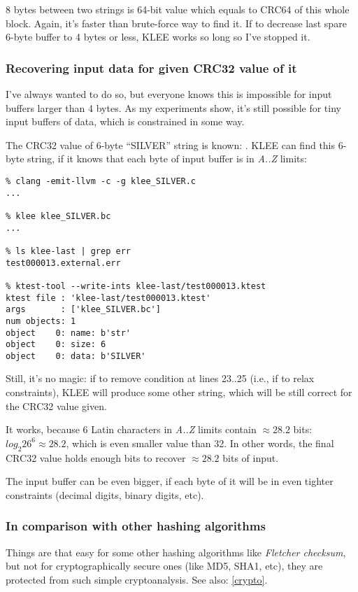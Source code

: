 8 bytes between two strings is 64-bit value which equals to CRC64 of this whole block.
Again, it's faster than brute-force way to find it.
If to decrease last spare 6-byte buffer to 4 bytes or less, KLEE works so long so I've stopped it.

\subsubsection{Recovering input data for given CRC32 value of it}

I've always wanted to do so, but everyone knows this is impossible for input buffers larger than 4 bytes.
As my experiments show, it's still possible for tiny input buffers of data, which is constrained in some way.

The CRC32 value of 6-byte ``SILVER'' string is known: .
KLEE can find this 6-byte string, if it knows that each byte of input buffer is in \textit{A..Z} limits:



\begin{lstlisting}
% clang -emit-llvm -c -g klee_SILVER.c
...

% klee klee_SILVER.bc
...

% ls klee-last | grep err
test000013.external.err

% ktest-tool --write-ints klee-last/test000013.ktest
ktest file : 'klee-last/test000013.ktest'
args       : ['klee_SILVER.bc']
num objects: 1
object    0: name: b'str'
object    0: size: 6
object    0: data: b'SILVER'
\end{lstlisting}

Still, it's no magic: if to remove condition at lines 23..25 (i.e., if to relax constraints),
KLEE will produce some other string, which will be still correct for the CRC32 value given.

It works, because 6 Latin characters in \textit{A..Z} limits contain $\approx 28.2$ bits:
$log_2{26^6} \approx 28.2$, which is even smaller value than 32.
In other words, the final CRC32 value holds enough bits to recover $\approx 28.2$ bits of input.

The input buffer can be even bigger, if each byte of it will be in even tighter
constraints (decimal digits, binary digits, etc).

\subsubsection{In comparison with other hashing algorithms}

Things are that easy for some other hashing algorithms like \textit{Fletcher checksum},
but not for cryptographically secure ones (like MD5, SHA1, etc), they are protected from such simple cryptoanalysis.
See also: \ref{crypto}.

